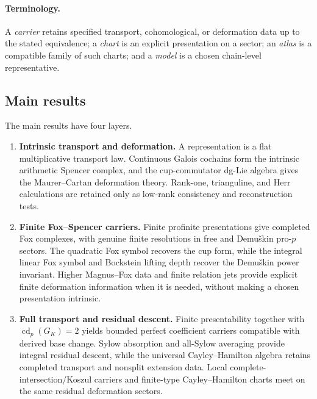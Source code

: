 \documentclass[11pt]{article}
\theoremstyle{definition}
\begin{document}
\paragraph{Terminology.}
A \emph{carrier} retains specified transport, cohomological, or deformation data up to the stated equivalence; a \emph{chart} is an explicit presentation on a sector; an \emph{atlas} is a compatible family of such charts; and a \emph{model} is a chosen chain-level representative.

\subsection{Main results}

The main results have four layers.

\begin{enumerate}[label=\textbf{(\arabic*)}]
\item \textbf{Intrinsic transport and deformation.}
A representation is a flat multiplicative transport law.  Continuous Galois cochains form the intrinsic arithmetic Spencer complex, and the cup-commutator dg-Lie algebra gives the Maurer--Cartan deformation theory.  Rank-one, trianguline, and Herr calculations are retained only as low-rank consistency and reconstruction tests.

\item \textbf{Finite Fox--Spencer carriers.}
Finite profinite presentations give completed Fox complexes, with genuine finite resolutions in free and Demu\v{s}kin pro-$p$ sectors.  The quadratic Fox symbol recovers the cup form, while the integral linear Fox symbol and Bockstein lifting depth recover the Demu\v{s}kin power invariant.  Higher Magnus--Fox data and finite relation jets provide explicit finite deformation information when it is needed, without making a chosen presentation intrinsic.

\item \textbf{Full transport and residual descent.}
Finite presentability together with $\operatorname{cd}_p(G_K)=2$ yields bounded perfect coefficient carriers compatible with derived base change.  Sylow absorption and all-Sylow averaging provide integral residual descent, while the universal Cayley--Hamilton algebra retains completed transport and nonsplit extension data.  Local complete-intersection/Koszul carriers and finite-type Cayley--Hamilton charts meet on the same residual deformation sectors.


\end{enumerate}
\end{document}

